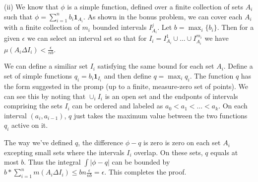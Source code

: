 \documentclass[10pt]{article}
\begin{document}
(ii) We know that $\phi$ is a simple function,
defined over a finite collection of sets $A_i$
such that $\phi = \sum_{i=1}^n b_i \mathbf{1}_{A_i}$.
As shown in the bonus problem, we can cover 
each $A_i$ with a finite collection of $m_i$ bounded intervals
$I_{A_i}^j$.
Let $b = \max_i \{b_i\}$.
Then for a given $\epsilon$ we can select an interval set 
so that for $I_i = I_{A_i}^1 \cup \dots \cup I_{A_i}^{m_i}$
we have $\mu(A_i \Delta I_i) < \frac{\epsilon}{n b}$.

We can define a similiar set $I_i$ satisfying the same bound 
for each set $A_i$. Define a set of simple functions
$q_i = b_i \mathbf{1}_{I_i}$ and then define $q = \max_i{q_i}$.
The function $q$ has the form suggested in the promp
(up to a finite, measure-zero set of points). We can see this
by noting that $\cup_i I_i$ is an open set and the 
endponts of intervals comprising the sets $I_i$
can be ordered and labeled as $a_0 < a_1 < \dots < a_k$.
On each interval $(a_i, a_{i-1})$, $q$ just takes the maximum value
between the two functions $q_i$ active on it.

The way we've defined $q$, the difference $\phi - q$ is zero
is zero on each set $A_i$ excepting small sets where the intervals
$I_i$ overlap. On these sets, $q$ equals at most $b$.
Thus the integral $\int \vert \phi - q \vert$ can be bounded
by $b * \sum_{i=1}^n m(A_i \Delta I_i) \le b n \frac{\epsilon}{n b}
= \epsilon$. This completes the proof.
\end{document}
